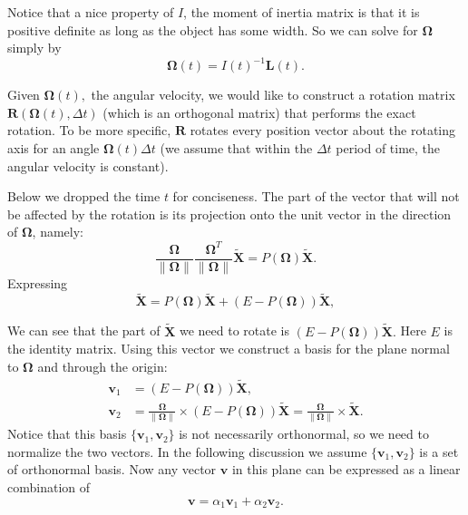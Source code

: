 \documentclass[12pt]{article}
\renewcommand{\(}{\left (}
\renewcommand{\)}{\right )}
\renewcommand{\vec}[1]{\boldsymbol{#1}}
\begin{document}
Notice that a nice property of $I$, the moment of inertia matrix is that it is positive definite as long as the object has some width. So we can solve for $\vec{\Omega}$ simply by \begin{equation}
\vec{\Omega}(t) = I(t)^{-1}\vec{L}(t).
\end{equation}

Given $\vec{\Omega}(t),$ the angular velocity, we would like to construct a rotation matrix $\vec{R}(\vec{\Omega}(t), \Delta t)$ (which is an orthogonal matrix) that performs the exact rotation. To be more specific, $\vec{R}$ rotates every position vector about the rotating axis for an angle $\vec{\Omega}(t)\Delta t$ (we assume that within the $\Delta t$ period of time, the angular velocity is constant).

Below we dropped the time $t$ for conciseness. The part of the vector that will not be affected by the rotation is its projection onto the unit vector in the direction of $\vec{\Omega}$, namely:
\begin{equation}
\frac{\vec{\Omega}}{\|\vec{\Omega}\|} \frac{\vec{\Omega}^T}{\|\vec{\Omega}\|} \widetilde{\vec{X}} = {P}(\vec{\Omega}) \widetilde{\vec{X}}.
\end{equation}
Expressing
\begin{equation}
\widetilde{\vec{X}} = {P}(\vec{\Omega}) \widetilde{\vec{X}} + (E - {P}(\vec{\Omega})) \widetilde{\vec{X}},
\end{equation}

We can see that the part of $\widetilde{\vec{X}}$ we need to rotate is $(E - {P}({\vec{\Omega}})) \widetilde{\vec{X}}.$  Here $E$ is the identity matrix. Using this vector we construct a basis for the plane normal to $\vec{\Omega}$ and through the origin:
\begin{align}
    \vec{v}_1 &=  (E - P({\vec{\Omega}})) \widetilde{\vec{X}}, \\
\vec{v}_2 &=  \frac{\vec{\Omega}}{\|\vec{\Omega}\|} \times (E - {P}(\vec{\Omega})) \widetilde{\vec{ X}} = \frac{\vec{\Omega}}{\|{\vec{ \Omega}}\|} \times \widetilde{\vec{X}}.
\end{align}
 Notice that this basis $\{\vec{v}_1, \vec{v}_2\}$ is not necessarily orthonormal, so we need to normalize the two vectors. In the following discussion we assume $\{\vec{v}_1, \vec{v}_2\}$ is a set of orthonormal basis.  Now any vector $\vec{v}$ in this plane can be expressed as a linear combination of
\begin{equation}
    \vec{v} = \alpha_1 \vec{v}_1 + \alpha_2 \vec{v}_2.
\end{equation}
\end{document}
